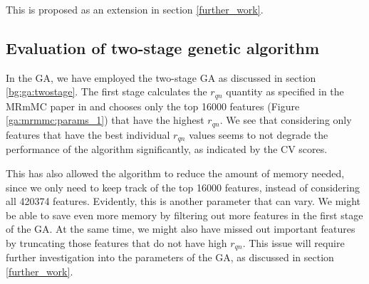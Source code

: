 \documentclass[12pt, twoside, a4paper]{report}
\begin{document}
This is proposed as an extension in section \ref{further_work}.

\subsection{Evaluation of two-stage genetic algorithm}

In the GA, we have employed the two-stage GA as discussed in section \ref{bg:ga:twostage}. The first stage calculates the $r_{qn}$ quantity as specified in the MRmMC paper in \cite{RefWorks:187} and chooses only the top 16000 features (Figure \ref{ga:mrmmc:params_1}) that have the highest $r_{qn}$. We see that considering only features that have the best individual $r_{qn}$ values seems to not degrade the performance of the algorithm significantly, as indicated by the CV scores.

This has also allowed the algorithm to reduce the amount of memory needed, since we only need to keep track of the top 16000 features, instead of considering all 420374 features. Evidently, this is another parameter that can vary. We might be able to save even more memory by filtering out more features in the first stage of the GA. At the same time, we might also have missed out important features by truncating those features that do not have high $r_{qn}$. This issue will require further investigation into the parameters of the GA, as discussed in section \ref{further_work}.





\end{document}
